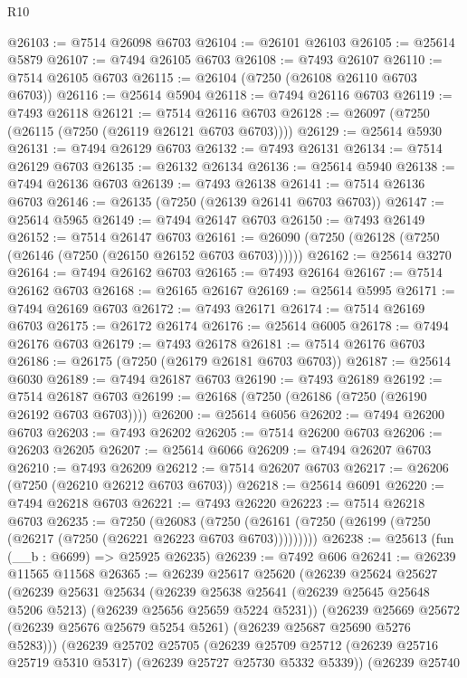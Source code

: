 \begin{lexlean}{R10}
\begin{coremodule}
@26103 := @7514 @26098 @6703
@26104 := @26101 @26103
@26105 := @25614 @5879
@26107 := @7494 @26105 @6703
@26108 := @7493 @26107
@26110 := @7514 @26105 @6703
@26115 := @26104 (@7250 (@26108 @26110 @6703 @6703))
@26116 := @25614 @5904
@26118 := @7494 @26116 @6703
@26119 := @7493 @26118
@26121 := @7514 @26116 @6703
@26128 := @26097 (@7250 (@26115 (@7250 (@26119 @26121 @6703 @6703))))
@26129 := @25614 @5930
@26131 := @7494 @26129 @6703
@26132 := @7493 @26131
@26134 := @7514 @26129 @6703
@26135 := @26132 @26134
@26136 := @25614 @5940
@26138 := @7494 @26136 @6703
@26139 := @7493 @26138
@26141 := @7514 @26136 @6703
@26146 := @26135 (@7250 (@26139 @26141 @6703 @6703))
@26147 := @25614 @5965
@26149 := @7494 @26147 @6703
@26150 := @7493 @26149
@26152 := @7514 @26147 @6703
@26161 := @26090 (@7250 (@26128 (@7250 (@26146 (@7250 (@26150 @26152 @6703 @6703))))))
@26162 := @25614 @3270
@26164 := @7494 @26162 @6703
@26165 := @7493 @26164
@26167 := @7514 @26162 @6703
@26168 := @26165 @26167
@26169 := @25614 @5995
@26171 := @7494 @26169 @6703
@26172 := @7493 @26171
@26174 := @7514 @26169 @6703
@26175 := @26172 @26174
@26176 := @25614 @6005
@26178 := @7494 @26176 @6703
@26179 := @7493 @26178
@26181 := @7514 @26176 @6703
@26186 := @26175 (@7250 (@26179 @26181 @6703 @6703))
@26187 := @25614 @6030
@26189 := @7494 @26187 @6703
@26190 := @7493 @26189
@26192 := @7514 @26187 @6703
@26199 := @26168 (@7250 (@26186 (@7250 (@26190 @26192 @6703 @6703))))
@26200 := @25614 @6056
@26202 := @7494 @26200 @6703
@26203 := @7493 @26202
@26205 := @7514 @26200 @6703
@26206 := @26203 @26205
@26207 := @25614 @6066
@26209 := @7494 @26207 @6703
@26210 := @7493 @26209
@26212 := @7514 @26207 @6703
@26217 := @26206 (@7250 (@26210 @26212 @6703 @6703))
@26218 := @25614 @6091
@26220 := @7494 @26218 @6703
@26221 := @7493 @26220
@26223 := @7514 @26218 @6703
@26235 := @7250
    (@26083 (@7250 (@26161 (@7250 (@26199 (@7250 (@26217 (@7250 (@26221 @26223 @6703 @6703)))))))))
@26238 := @25613 (fun (__b : @6699) => @25925 @26235)
@26239 := @7492 @606
@26241 := @26239 @11565 @11568
@26365 := @26239
    @25617
    @25620
    (@26239
      @25624
      @25627
      (@26239
        @25631
        @25634
        (@26239 @25638 @25641 (@26239 @25645 @25648 @5206 @5213) (@26239 @25656 @25659 @5224 @5231))
        (@26239
          @25669
          @25672
          (@26239 @25676 @25679 @5254 @5261)
          (@26239 @25687 @25690 @5276 @5283)))
      (@26239
        @25702
        @25705
        (@26239 @25709 @25712 (@26239 @25716 @25719 @5310 @5317) (@26239 @25727 @25730 @5332 @5339))
        (@26239
          @25740

\end{coremodule}
\end{lexlean}
